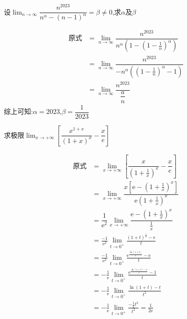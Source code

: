 \documentclass[8pt a4paper, oneside, UTF8]{ctexbook}
\begin{document}
\begin{sloppypar}
\begin{note}
    \end{note}
    \begin{problem}
    设$\lim_{n\to\infty}\dfrac{n^{2023}}{n^{\alpha}-(n-1)^{\alpha}}=\beta\neq0$,求$\alpha$及$\beta$
    \end{problem}
    \begin{solution}
        \begin{align*}
            \text{原式} & = \lim_{n\to\infty} \dfrac{n^{2023}}{n^\alpha(1-(1-\frac{1}{n})^\alpha)}  \\
                      & = \lim_{n\to\infty} \dfrac{n^{2023}}{-n^\alpha((1-\frac{1}{n})^\alpha-1)} \\
                      & = \lim_{n \to \infty} \dfrac{n^{2023}}{\dfrac{a}{n}}
        \end{align*}
        综上可知:$\alpha =2023$,$\beta=\dfrac{1}{2023}$
    \end{solution}
    \begin{problem}
    求极限$\lim_{x\to+\infty}[\dfrac{x^{1+x}}{\left(1+x\right)^x}-\dfrac xe]$
    \end{problem}
    \begin{solution}
        \begin{align*}
            \text{原式} & =\lim_{x\to+\infty}\left[\dfrac{x}{\left(1+\frac{1}{x}\right)^{x}}-\dfrac{x}{e}\right]                                       \\
                      & =\lim_{x\to+\infty}\dfrac{x\left[\mathrm{e}-\left(1+\frac{1}{x}\right)^{x}\right]}{\mathrm{e}\left(1+\frac{1}{x}\right)^{x}} \\
                      & =\dfrac1{\mathrm{e}^2}\lim_{x\to+\infty}\dfrac{\mathrm{e}-\left(1+\frac1x\right)^x}{\frac1x}                                 \\
                      & = \frac{-1}{\mathrm{e}^2}\lim_{t\to0^+}\frac{(1+t)^{\frac1t}-\mathrm{e}}t                                                    \\
                      & =\frac{-1}{\mathrm{e}^2}\lim_{t\to0^+}\frac{\mathrm{e}^{\frac{\ln(1+t)}t}-\mathrm{e}}t                                       \\
                      & = -\frac1{\mathrm{e}}\lim_{t\to0^+}\frac{\mathrm{e}^{\frac{\ln(1+t)-t}t}-1}t                                                 \\
                      & = -\frac{1}{\mathrm{e}}\lim_{t\to0^{+}}\frac{\ln(1+t)-t}{t^{2}}                                                              \\
                      & =-\frac1{\mathrm{e}}\operatorname*{lim}_{t\to0^+}\frac{-\frac12t^2}{t^2}=\frac1{2\mathrm{e}}
        \end{align*}
    \end{solution}


\end{sloppypar}
\end{document}
